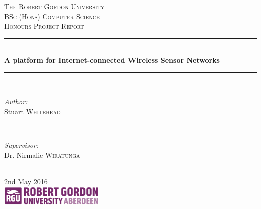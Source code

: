 \begin{titlepage}
  \newcommand{\HRule}{\rule{\linewidth}{0.5mm}}
  \center

  \textsc{\LARGE The Robert Gordon University}\\[1.5cm]
  \textsc{\Large BSc (Hons) Computer Science}\\[0.5cm]
  \textsc{\large Honours Project Report}\\[0.5cm]

  \HRule \\[0.4cm]
  { \huge \bfseries A platform for Internet-connected Wireless Sensor Networks}\\[0.4cm]
  \HRule \\[1.5cm]

  \begin{minipage}{0.4\textwidth}
  \begin{flushleft} \large
  \emph{Author:}\\
  Stuart \textsc{Whitehead}
  \end{flushleft}
  \end{minipage}
  ~
  \begin{minipage}{0.4\textwidth}
  \begin{flushright} \large
  \emph{Supervisor:} \\
  Dr. Nirmalie \textsc{Wiratunga}
  \end{flushright}
  \end{minipage}\\[4cm]

  {\large 2nd May 2016}\\[3cm]

  \includegraphics[width=5cm, scale=0.1]{assets/rgu-logo.png}\\[1cm] %

  \vfill

\end{titlepage}
